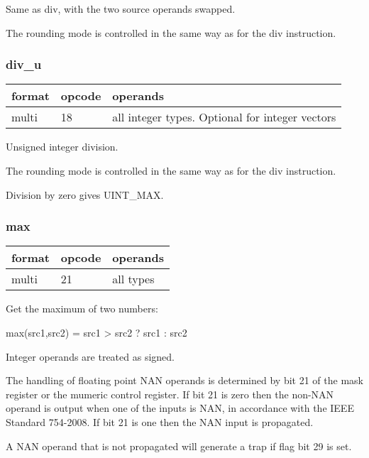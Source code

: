 \documentclass[forwardcom.tex]{subfiles}
\begin{document}
Same as div, with the two source operands swapped.

The rounding mode is controlled in the same way as for the div instruction.

\subsubsection{div\_u}
\label{table:divUInstruction}
\begin{tabular}{|p{12mm}|p{12mm}|p{110mm}|}
\hline
\bfseries format & \bfseries opcode & \bfseries operands \\ \hline
multi & 18 & all integer types. Optional for integer vectors \\ \hline
\end{tabular}
\vspace{2mm}

Unsigned integer division.

The rounding mode is controlled in the same way as for the div instruction.

\vspace{2mm}
Division by zero gives UINT\_MAX.

\subsubsection{max}
\label{table:maxInstruction}
\begin{tabular}{|p{12mm}|p{12mm}|p{110mm}|}
\hline
\bfseries format & \bfseries opcode & \bfseries operands \\ \hline
multi & 21 & all types \\ \hline
\end{tabular}
\vspace{2mm}

Get the maximum of two numbers:

max(src1,src2) = src1 \textgreater{} src2 ? src1 : src2
\vspace{2mm}

Integer operands are treated as signed.
\vspace{2mm}

The handling of floating point NAN operands is determined by bit 21 of the mask register or the mumeric control register. If bit 21 is zero then the non-NAN operand is output when one of the inputs is NAN, in accordance with the IEEE Standard 754-2008. If bit 21 is one then the NAN input is propagated.
\vspace{2mm}

A NAN operand that is not propagated will generate a trap if flag bit 29 is set.
\end{document}
